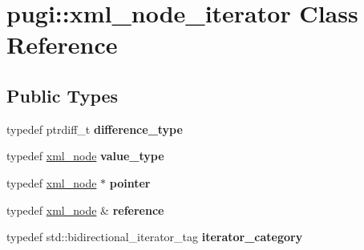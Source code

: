 \hypertarget{classpugi_1_1xml__node__iterator}{}\section{pugi\+:\+:xml\+\_\+node\+\_\+iterator Class Reference}
\label{classpugi_1_1xml__node__iterator}
\subsection*{Public Types}
\begin{DoxyCompactItemize}
\item 
\hypertarget{classpugi_1_1xml__node__iterator_af493930602ec2f56d27c84d148d692ef}{}typedef ptrdiff\+\_\+t {\bfseries difference\+\_\+type}\label{classpugi_1_1xml__node__iterator_af493930602ec2f56d27c84d148d692ef}

\item 
\hypertarget{classpugi_1_1xml__node__iterator_a2b0d0c1dd1238c23ef07feeb6069393f}{}typedef \hyperlink{classpugi_1_1xml__node}{xml\+\_\+node} {\bfseries value\+\_\+type}\label{classpugi_1_1xml__node__iterator_a2b0d0c1dd1238c23ef07feeb6069393f}

\item 
\hypertarget{classpugi_1_1xml__node__iterator_a8e5476d1f854eb64f92f42dac648acf1}{}typedef \hyperlink{classpugi_1_1xml__node}{xml\+\_\+node} $\ast$ {\bfseries pointer}\label{classpugi_1_1xml__node__iterator_a8e5476d1f854eb64f92f42dac648acf1}

\item 
\hypertarget{classpugi_1_1xml__node__iterator_ae2efdeb44673427f99b7cc1e726bfa13}{}typedef \hyperlink{classpugi_1_1xml__node}{xml\+\_\+node} \& {\bfseries reference}\label{classpugi_1_1xml__node__iterator_ae2efdeb44673427f99b7cc1e726bfa13}

\item 
\hypertarget{classpugi_1_1xml__node__iterator_ac65c62a919aa8818f0f1204ef0ab24c1}{}typedef std\+::bidirectional\+\_\+iterator\+\_\+tag {\bfseries iterator\+\_\+category}\label{classpugi_1_1xml__node__iterator_ac65c62a919aa8818f0f1204ef0ab24c1}

\end{DoxyCompactItemize}
